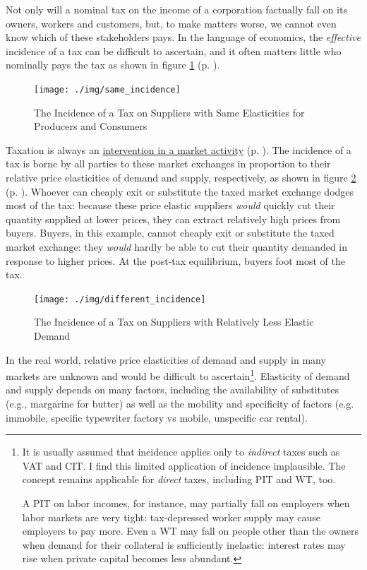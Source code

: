 Not only will a nominal tax on the income of a corporation factually fall on its owners, workers and customers, but, to make matters worse, we cannot even know which of these stakeholders pays. In the language of economics, the \emph{effective} incidence of a tax can be difficult to ascertain, and it often matters little who nominally pays the tax as shown in figure \ref{fig:same_incidence} (p. \pageref{fig:same_incidence}). 

 \begin{figure}[htbp]
	\centering
	\texttt{[image: ./img/same\_incidence]}  
	\caption[Incidence of a Tax on Suppliers with Unit-Elastic Supply and Demand]{The Incidence of a Tax on Suppliers with Same Elasticities for Producers and Consumers}
	\label{fig:same_incidence}
\end{figure}

Taxation is always an \hyperref[sec:market_vs_command]{intervention in a market activity} (p. \pageref{sec:market_vs_command}). The incidence of a tax is borne by all parties to these market exchanges in proportion to their relative price elasticities of demand and supply, respectively, as shown in figure \ref{fig:different_incidence} (p. \pageref{fig:different_incidence}). Whoever can cheaply exit or substitute the taxed market exchange dodges most of the tax: because these price elastic suppliers \emph{would} quickly cut their quantity supplied at lower prices, they can extract relatively high prices from buyers. Buyers, in this example, cannot cheaply exit or substitute the taxed market exchange: they \emph{would} hardly be able to cut their quantity demanded in response to higher prices. At the post-tax equilibrium, buyers foot most of the tax.

 \begin{figure}[htbp]
	\centering
	\texttt{[image: ./img/different\_incidence]}  
	\caption[Incidence of a Tax on Suppliers with Relatively Inelastic Demand]{The Incidence of a Tax on Suppliers with Relatively Less Elastic Demand}
	\label{fig:different_incidence}
\end{figure}

In the real world, relative price elasticities of demand and supply in many markets are unknown and would be difficult to ascertain\footnote{
	It is usually assumed that incidence applies only to \emph{indirect} taxes such as \gls{VAT} and \gls{CIT}. I find this limited application of incidence implausible. The concept remains applicable for \emph{direct} taxes, including \gls{PIT} and \gls{WT}, too. 
	
	A \gls{PIT} on labor incomes, for instance, may partially fall on employers when labor markets are very tight: tax-depressed worker supply may cause employers to pay more. Even a \gls{WT} may fall on people other than the owners when demand for their collateral is sufficiently inelastic: interest rates may rise when private capital becomes less abundant.}. 
Elasticity of demand and supply depends on many factors, including the availability of substitutes (e.g., margarine for butter) as well as the mobility and specificity of factors (e.g. immobile, specific typewriter factory vs mobile, unspecific car rental).

